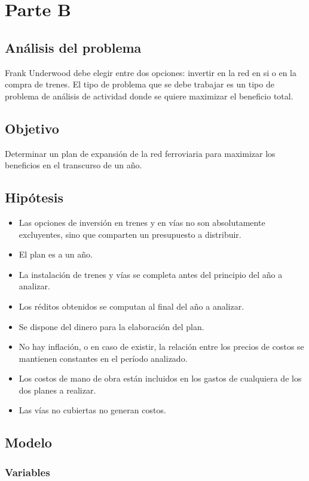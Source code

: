\documentclass[10pt, a4paper, titlepage,
	oneside,
	fleqn, leqno]{article}
\let\oldsection\section
\def\section{\cleardoublepage\oldsection}
\begin{document}
\section{Parte B}
\subsection{Análisis del problema}
Frank Underwood debe elegir entre dos opciones: invertir en la red en si o en la compra de trenes.
El tipo de problema que se debe trabajar es un tipo de problema de análisis de actividad donde se quiere maximizar el beneficio total.
\subsection{Objetivo}
Determinar un plan de expansión de la red ferroviaria para maximizar los beneficios en el transcurso de un año.

\subsection{Hipótesis}
\begin{itemize}
 \item Las opciones de inversión en trenes y en vías no son absolutamente excluyentes, sino que comparten un presupuesto a distribuir.
 \item El plan es a un año.
 \item La instalación de trenes y vías se completa antes del principio del año a analizar.
 \item Los réditos obtenidos se computan al final del año a analizar.
 \item Se dispone del dinero para la elaboración del plan.
 \item No hay inflación, o en caso de existir, la relación entre los precios de costos se mantienen constantes en el período analizado.
 \item Los costos de mano de obra están incluidos en los gastos de cualquiera de los dos planes a realizar.
 \item Las vías no cubiertas no generan costos.
\end{itemize}

\subsection{Modelo}
\subsubsection{Variables}
\end{document}
